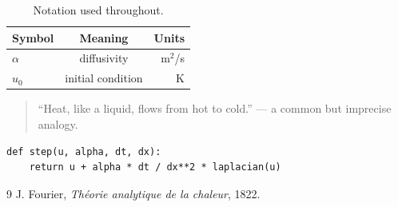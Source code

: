 \documentclass{article}
\begin{document}
\begin{table}
\centering
\begin{tabular}{lcr}
\hline
Symbol & Meaning & Units \\
\hline
$\alpha$ & diffusivity & m$^2$/s \\
$u_0$ & initial condition & K \\
\end{tabular}
\caption{Notation used throughout.}
\label{tab:notation}
\end{table}

\begin{quote}
``Heat, like a liquid, flows from hot to cold.'' --- a common but imprecise analogy.
\end{quote}

\begin{verbatim}
def step(u, alpha, dt, dx):
    return u + alpha * dt / dx**2 * laplacian(u)
\end{verbatim}

\begin{thebibliography}{9}
 J. Fourier, \textit{Th\'eorie analytique de la chaleur}, 1822.
\end{thebibliography}
\end{document}
